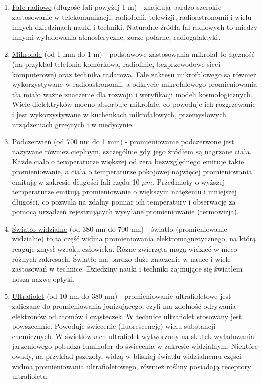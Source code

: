 \begin{enumerate}[-]
	\item \underline{Fale radiowe} (długość fali powyżej 1 m) - znajdują bardzo szerokie zastosowanie w telekomunikacji, radiofonii, telewizji, radioastronomii i wielu innych dziedzinach nauki i techniki. Naturalne źródła fal radiowych to między innymi wyładowania atmosferyczne, zorze polarne, radiogalaktyki.
	\item \underline{Mikrofale} (od 1 mm do 1 m) - podstawowe zastosowania mikrofal to łączność (na przykład telefonia komórkowa, radiolinie, bezprzewodowe sieci komputerowe) oraz technika radarowa. Fale zakresu mikrofalowego są również wykorzystywane w radioastronomii, a odkrycie mikrofalowego promieniowania tła miało ważne znaczenie dla rozwoju i weryfikacji modeli kosmologicznych. Wiele dielektryków mocno absorbuje mikrofale, co powoduje ich rozgrzewanie i jest wykorzystywane w kuchenkach mikrofalowych, przemysłowych urządzeniach grzejnych i w medycynie.
	\item \underline{Podczerwień} (od 700 nm do 1 mm) - promieniowanie podczerwone jest nazywane również cieplnym, szczególnie gdy jego źródłem są nagrzane ciała. Każde ciało o temperaturze większej od zera bezwzględnego emituje takie promieniowanie, a ciała o temperaturze pokojowej najwięcej promieniowania emitują w zakresie długości fali rzędu 10 $ \mu m $. Przedmioty o wyższej temperaturze emitują promieniowanie o większym natężeniu i mniejszej długości, co pozwala na zdalny pomiar ich temperatury i obserwację za pomocą urządzeń rejestrujących wysyłane promieniowanie (termowizja).
	\item \underline{Światło widzialne} (od 380 nm do 700 nm) - światło (promieniowanie widzialne) to ta część widma promieniowania elektromagnetycznego, na którą reaguje zmysł wzroku człowieka. Różne zwierzęta mogą widzieć w nieco różnych zakresach. Światło ma bardzo duże znaczenie w nauce i wiele zastosowań w technice. Dziedziny nauki i techniki zajmujące się światłem noszą nazwę optyki.
	\item \underline{Ultrafiolet} (od 10 nm do 380 nm) - promieniowanie ultrafioletowe jest zaliczane do promieniowania jonizującego, czyli ma zdolność odrywania elektronów od atomów i cząsteczek. W technice ultrafiolet stosowany jest powszechnie. Powoduje świecenie (fluorescencję) wielu substancji chemicznych. W świetlówkach ultrafiolet wytworzony na skutek wyładowania jarzeniowego pobudza luminofor do świecenia w zakresie widzialnym. Niektóre owady, na przykład pszczoły, widzą w bliskiej światłu widzialnemu części widma promieniowania ultrafioletowego, również rośliny posiadają receptory ultrafioletu. 

\end{enumerate}
